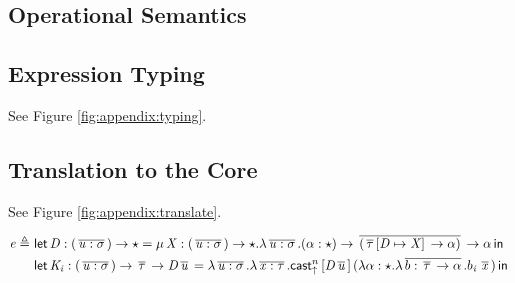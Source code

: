 \subsection{Operational Semantics}
\ottdefnstepsrc{}
\ottusedrule{\ottdruleSCXXCaseMatch{}}

\subsection{Expression Typing}
See Figure \ref{fig:appendix:typing}.
\begin{figure*}
\ottdefnctxsrc{}
\ottdefnpgmsrc{}
\ottdefndeclsrc{}
\ottdefnpatsrc{}
\ottdefnexprsrc{}
\caption{Typing rules of source language}
\label{fig:appendix:typing}
\end{figure*}

\subsection{Translation to the Core}
See Figure \ref{fig:appendix:translate}.
\begin{figure*}
\ottdefnctxtrans{}
\ottdefnpgmtrans{}
\ottdefndecltrans{}
\begin{align*}
\mathit{e}  \triangleq ~  &  \mathsf{let} \, \mathit{D}  :  (  \,\overline{  \mathit{u}  :  \sigma  }\,  )  \rightarrow  \star  =  \mu \, \mathit{X}  :  (  \,\overline{  \mathit{u}  :  \sigma  }\,  )  \rightarrow  \star  .  \lambda  \,\overline{  \mathit{u}  :  \sigma  }\,  .  (  \alpha  :  \star  )  \rightarrow  \,\overline{  (  \,\overline{  \tau  }\,  [  \mathit{D}  \mapsto  \mathit{X}  ] \,  \rightarrow  \alpha  )  }\,  \rightarrow  \alpha \, \mathsf{in} \, \\ &  \mathsf{let} \, \mathit{K_{\mathit{i}}}  :  (  \,\overline{  \mathit{u}  :  \sigma  }\,  )  \rightarrow  \,\overline{  \tau  }\,  \rightarrow  \mathit{D}    \,\overline{  \mathit{u}  }\,  =  \lambda  \,\overline{  \mathit{u}  :  \sigma  }\,  .  \lambda  \,\overline{  \mathit{x}  :  \tau  }\,  .  \mathsf{cast}_{\uparrow}^n \, [  \mathit{D}    \,\overline{  \mathit{u}  }\,  ] \,  (  \lambda  \alpha  :  \star  .  \lambda  \,\overline{  b  :  \,\overline{  \tau  }\,  \rightarrow  \alpha  }\,  .  b_{\mathit{i}} \, \,\overline{  \mathit{x}  }\,  ) \, \mathsf{in} \, 
\end{align*}
\ottdefnpattrans{}
\ottdefnexprtrans{}
\caption{Translation rules of source language}
\label{fig:appendix:translate}
\end{figure*}



